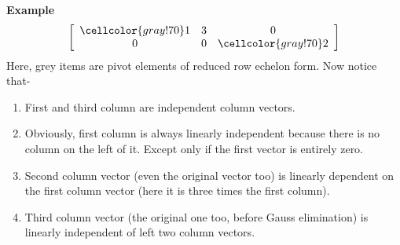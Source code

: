 \documentclass{article}
\newcommand\bg{\cellcolor{gray!70}}
\begin{document}
\textbf{Example}
\[\left[\begin{array}{ccc}
    \bg1 & 3 & 0\\
    0 &0 &\bg2
    \end{array}\right]
\]
Here, grey items are pivot elements of reduced row echelon form. Now notice that-
\begin{enumerate}
    \item First and third column are independent column vectors.
    \item Obviously, first column is always linearly independent because there is no column on the left of it. Except only if the first vector is entirely zero. 
    \item Second column vector (even the original vector too) is linearly dependent on the first column vector (here it is three times the first column).
    \item Third column vector (the original one too, before Gauss elimination) is linearly independent of left two column vectors.
\end{enumerate}
\end{document}
